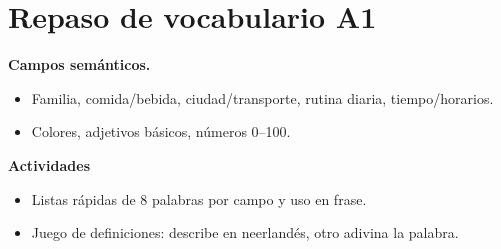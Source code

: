 \section{Repaso de vocabulario A1}
\textbf{Campos semánticos.}
\begin{itemize}[leftmargin=*]
  \item Familia, comida/bebida, ciudad/transporte, rutina diaria, tiempo/horarios.
  \item Colores, adjetivos básicos, números 0--100.
\end{itemize}

\textbf{Actividades}
\begin{itemize}[leftmargin=*]
  \item Listas rápidas de 8 palabras por campo y uso en frase.
  \item Juego de definiciones: describe en neerlandés, otro adivina la palabra.
\end{itemize}
